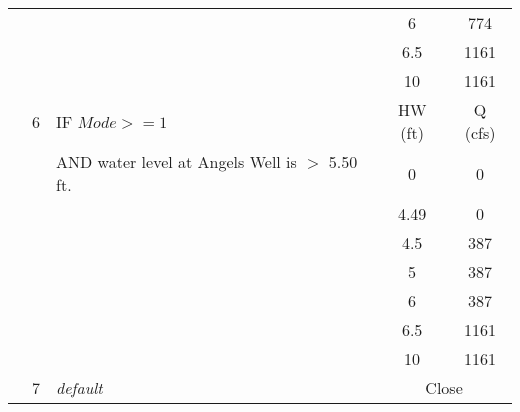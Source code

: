 \begin{table}[!h]
\begin{tabular}{|l|c|l|c|c|}
              &     &                                              & 6	&	774  \\
              &     &                                              & 6.5	&	1161  \\
              &     &                                              & 10	&	1161  \\
\hline
              &  6  & IF $Mode>=1$                                 &  HW (ft) & Q (cfs)  \\
              &     & AND water level at Angels Well is $>$ 5.50 ft.  & 0	&	  0    \\
              &     &                                              & 4.49	&	  0    \\
              &     &                                              & 4.5	&	387  \\
              &     &                                              & 5	&	387  \\
              &     &                                              & 6	&	387  \\
              &     &                                              & 6.5	&	1161  \\
              &     &                                              & 10	&	1161  \\
\hline
              &  7  & \it{default}                  & \multicolumn{2}{|c|}{Close}           \\

\hline
\hline
\end{tabular}
\end{table}
\normalsize

\clearpage


